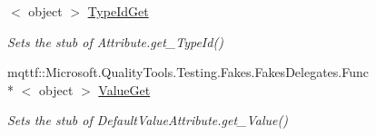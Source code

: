 \begin{DoxyCompactItemize}
$<$ object $>$ \hyperlink{class_system_1_1_component_model_1_1_fakes_1_1_stub_default_value_attribute_a67d4ebc8b914a9c51c2b4118d8124744}{Type\-Id\-Get}
\begin{DoxyCompactList}\small\item\em Sets the stub of Attribute.\-get\-\_\-\-Type\-Id()\end{DoxyCompactList}\item 
mqttf\-::\-Microsoft.\-Quality\-Tools.\-Testing.\-Fakes.\-Fakes\-Delegates.\-Func\\*
$<$ object $>$ \hyperlink{class_system_1_1_component_model_1_1_fakes_1_1_stub_default_value_attribute_a4757fb7474efae65108451ec67f712c6}{Value\-Get}
\begin{DoxyCompactList}\small\item\em Sets the stub of Default\-Value\-Attribute.\-get\-\_\-\-Value()\end{DoxyCompactList}\end{DoxyCompactItemize}

